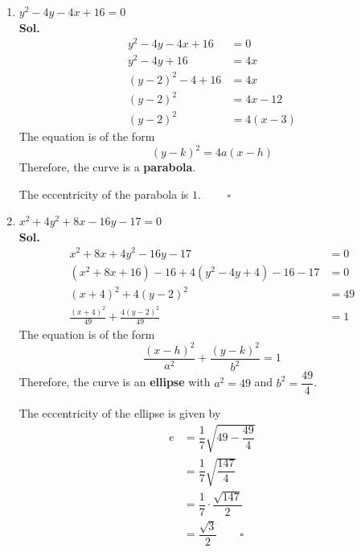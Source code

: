 \documentclass{report}
\newcommand{\sol}{\vspace{1em}\\\textbf{Sol.}}
\newcommand{\eos}{ \qquad \square}
\begin{document}
\begin{enumerate}
\begin{enumerate}
              \item $y^2-4y-4x+16=0$
                    \sol{}
                    \begin{align*}
                        y^2-4y-4x+16     & = 0       \\
                        y^2-4y+16        & = 4x      \\
                        (y-2)^2 - 4 + 16 & = 4x      \\
                        (y-2)^2          & = 4x - 12 \\
                        (y-2)^2          & = 4(x-3)
                    \end{align*}
                    The equation is of the form
                    \begin{equation*}
                        (y-k)^2 = 4a(x-h)
                    \end{equation*}
                    Therefore, the curve is a \textbf{parabola}.

                    The eccentricity of the parabola is $1$. $\eos$

                    \newpage
              \item $x^2+4y^2+8x-16y-17=0$
                    \sol{}
                    \begin{align*}
                        x^2+8x+4y^2-16y-17                        & = 0  \\
                        (x^2+8x+16) - 16 + 4(y^2-4y + 4) - 16 -17 & = 0  \\
                        (x+4)^2 + 4(y-2)^2                        & = 49 \\
                        \frac{(x+4)^2}{49} + \frac{4(y-2)^2}{49}  & = 1
                    \end{align*}
                    The equation is of the form
                    \begin{equation*}
                        \frac{(x-h)^2}{a^2} + \frac{(y-k)^2}{b^2} = 1
                    \end{equation*}
                    Therefore, the curve is an \textbf{ellipse} with $a^2=49$ and $b^2=\dfrac{49}{4}$.

                    The eccentricity of the ellipse is given by
                    \begin{align*}
                        e & = \dfrac{1}{7}\sqrt{49 - \dfrac{49}{4}}  \\
                          & = \dfrac{1}{7}\sqrt{\dfrac{147}{4}}      \\
                          & = \dfrac{1}{7}\cdot\dfrac{\sqrt{147}}{2} \\
                          & = \dfrac{\sqrt{3}}{2} \eos
                    \end{align*}


\end{enumerate}
\end{enumerate}
\end{document}
